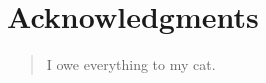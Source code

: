 \begingroup
\let\raggedsection\centering

\chapter*{Acknowledgments}
\label{cha:acknowledgments}
\endgroup
\begin{quotation}
  \noindent I owe everything to my cat.
\end{quotation}
